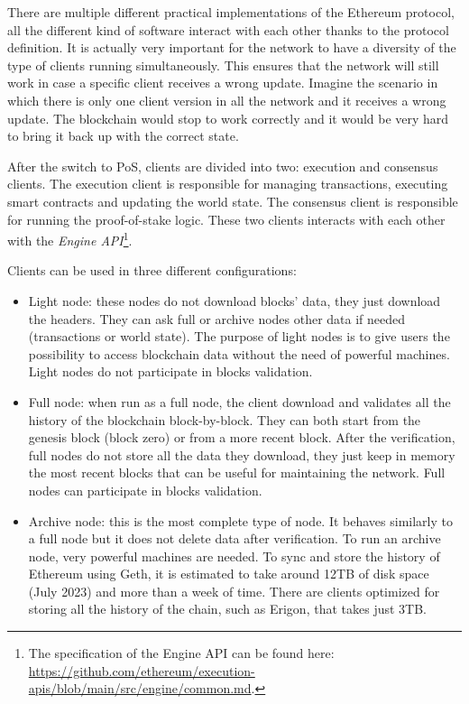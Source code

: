 There are multiple different practical implementations of the Ethereum protocol, all the different kind of software interact with each other thanks to the protocol definition. It is actually very important for the network to have a diversity of the type of clients running simultaneously. This ensures that the network will still work in case a specific client receives a wrong update. Imagine the scenario in which there is only one client version in all the network and it receives a wrong update. The blockchain would stop to work correctly and it would be very hard to bring it back up with the correct state.

After the switch to PoS, clients are divided into two: execution and consensus clients. The execution client is responsible for managing transactions, executing smart contracts and updating the world state. The consensus client is responsible for running the proof-of-stake logic. These two clients interacts with each other with the \textit{Engine API}\footnote{The specification of the Engine API can be found here: \url{https://github.com/ethereum/execution-apis/blob/main/src/engine/common.md}.}.

Clients can be used in three different configurations:

\begin{itemize}
    \item Light node: these nodes do not download blocks' data, they just download the headers. They can ask full or archive nodes other data if needed (transactions or world state). The purpose of light nodes is to give users the possibility to access blockchain data without the need of powerful machines. Light nodes do not participate in blocks validation.
    \item Full node: when run as a full node, the client download and validates all the history of the blockchain block-by-block. They can both start from the genesis block (block zero) or from a more recent block. After the verification, full nodes do not store all the data they download, they just keep in memory the most recent blocks that can be useful for maintaining the network. Full nodes can participate in blocks validation.
    \item Archive node: this is the most complete type of node. It behaves similarly to a full node but it does not delete data after verification. To run an archive node, very powerful machines are needed. To sync and store the history of Ethereum using Geth, it is estimated to take around 12TB of disk space (July 2023) and more than a week of time. There are clients optimized for storing all the history of the chain, such as Erigon, that takes just 3TB. 
\end{itemize}

